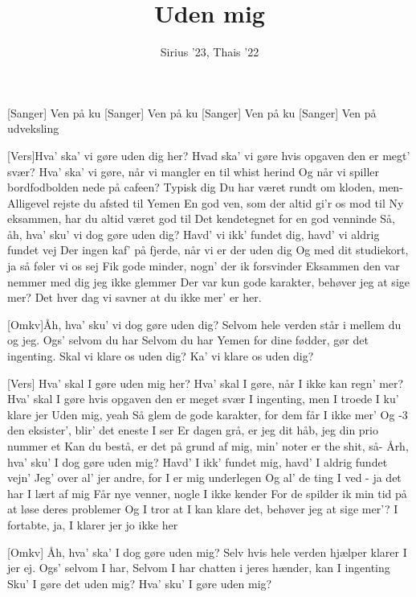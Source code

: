 \documentclass[a4paper,11pt]{article}
\title{Uden mig}
\author{Sirius '23, Thais '22}
\begin{document}
\maketitle

\begin{roles}
[Sanger] Ven på ku
[Sanger] Ven på ku
[Sanger] Ven på ku
[Sanger] Ven på udveksling
\end{roles}

\begin{song}

[Vers]Hva' ska' vi gøre uden dig her? 
Hvad ska' vi gøre hvis opgaven den er megt' svær?
Hva' ska' vi gøre, når vi mangler en til whist herind 
Og når vi spiller bordfodbolden nede på cafeen?
Typisk dig
Du har været rundt om kloden, men-
Alligevel rejste du afsted til Yemen
En god ven, som der altid gi'r os mod til 
Ny eksammen, har du altid været god til
Det kendetegnet for en god venninde
Så, åh, hva' sku' vi dog gøre uden dig?
Havd' vi ikk' fundet dig, havd' vi aldrig fundet vej
Der ingen kaf' på fjerde, når vi er der uden dig
Og med dit studiekort, ja så føler vi os sej
Fik gode minder, nogn' der ik forsvinder
Eksammen den var nemmer med dig jeg ikke glemmer 
Der var kun gode karakter, behøver jeg at sige mer?
Det hver dag vi savner at du ikke mer' er her.

[Omkv]Åh, hva' sku' vi dog gøre uden dig?
Selvom hele verden står i mellem du og jeg. 
Ogs' selvom du har
Selvom du har Yemen for dine fødder, gør det ingenting.
Skal vi klare os uden dig? 
Ka' vi klare os uden dig?

[Vers] Hva' skal I gøre uden mig her? 
Hva' skal I gøre, når I ikke kan regn' mer?
Hva' skal I gøre hvis opgaven den er meget svær
I ingenting, men I troede I ku' klare jer
Uden mig, yeah
Så glem de gode karakter, for dem får I ikke mer'
Og -3 den eksister', blir' det eneste I ser
Er dagen grå, er jeg dit håb, jeg din prio nummer et
Kan du bestå, er det på grund af mig, min' noter er the shit, så-
Årh, hva' sku' I dog gøre uden mig?
Havd' I ikk' fundet mig, havd' I aldrig fundet vejn'
Jeg' over al' jer andre, for I er mig underlegen
Og al' de ting I ved - ja det har I lært af mig
Får nye venner, nogle I ikke kender 
For de spilder ik min tid på at løse deres problemer
Og I tror at I kan klare det, behøver jeg at sige mer'?
I fortabte, ja, I klarer jer jo ikke her


[Omkv] Åh, hva' ska' I dog gøre uden mig?
Selv hvis hele verden hjælper klarer I jer ej.
Ogs' selvom I har,
Selvom I har chatten i jeres hænder, kan I ingenting
Sku' I gøre det uden mig? Hva' sku' I gøre uden mig?
\end{song}
\end{document}
